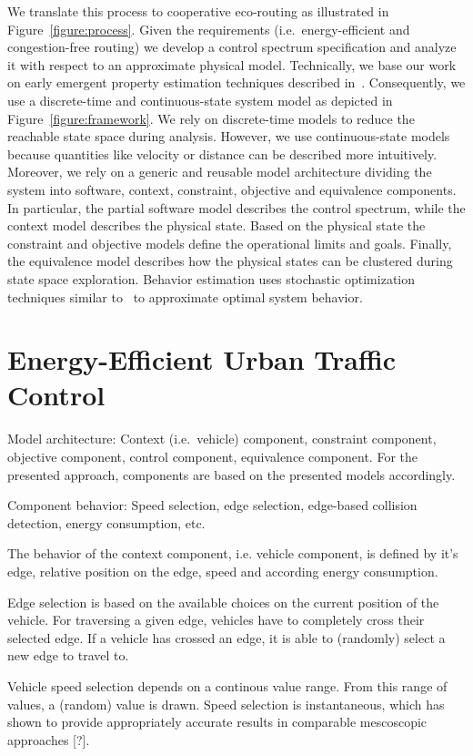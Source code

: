 \documentclass[conference]{../cls/IEEEtran}
\begin{document}
We translate this process to cooperative eco-routing as illustrated in Figure~\ref{figure:process}.
Given the requirements (i.e.\ energy-efficient and congestion-free routing) we develop a control spectrum specification and analyze it with respect to an approximate physical model.
Technically, we base our work on early emergent property estimation techniques described in~\cite{Hackenberg2012}.
Consequently, we use a discrete-time and continuous-state system model as depicted in Figure~\ref{figure:framework}.
We rely on discrete-time models to reduce the reachable state space during analysis.
However, we use continuous-state models because quantities like velocity or distance can be described more intuitively.
Moreover, we rely on a generic and reusable model architecture dividing the system into software, context, constraint, objective and equivalence components.
In particular, the partial software model describes the control spectrum, while the context model describes the physical state.
Based on the physical state the constraint and objective models define the operational limits and goals.
Finally, the equivalence model describes how the physical states can be clustered during state space exploration.
Behavior estimation uses stochastic optimization techniques similar to~\cite{Pereira1991} to approximate optimal system behavior.

\section{Energy-Efficient Urban Traffic Control}

Model architecture: Context (i.e.\ vehicle) component, constraint component, objective component, control component, equivalence component.
For the presented approach, components are based on the presented models
accordingly.

Component behavior: Speed selection, edge selection, edge-based collision detection, energy consumption, etc.

The behavior of the context component, i.e. vehicle component, is defined by
it's edge, relative position on the edge, speed and according energy
consumption.

Edge selection is based on the available choices on the current position of the
vehicle. For traversing a given edge, vehicles have to completely cross their
selected edge. If a vehicle has crossed an edge, it is able to (randomly)
select a new edge to travel to. 

Vehicle speed selection depends on a continous value range.
From this range of values, a (random) value is drawn. Speed selection is
instantaneous, which has shown to provide appropriately accurate results in
comparable mescoscopic approaches [?].
\end{document}
